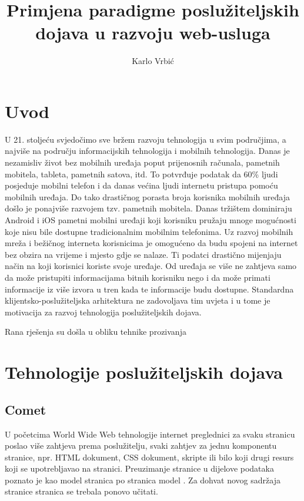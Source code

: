 \documentclass[times, utf8, zavrsni]{fer}
\begin{document}
\title{Primjena paradigme poslužiteljskih dojava u razvoju web-usluga}
\author{Karlo Vrbić}

\maketitle

\zahvala{}

\tableofcontents
\listoffigures

\chapter{Uvod}

U 21. stoljeću svjedočimo sve bržem razvoju tehnologija u svim područjima, a najviše na području informacijskih tehnologija i mobilnih tehnologija. Danas je nezamisliv život bez mobilnih uređaja poput prijenosnih računala, pametnih mobitela, tableta, pametnih satova, itd. To potvrđuje podatak da 60\% ljudi posjeduje mobilni telefon i da danas većina ljudi internetu pristupa pomoću mobilnih uređaja. Do tako drastičnog porasta broja korisnika mobilnih uređaja došlo je ponajviše razvojem tzv. pametnih mobitela. Danas tržištem dominiraju Android i iOS pametni mobilni uređaji koji korisniku pružaju mnoge mogućnosti koje nisu bile dostupne tradicionalnim mobilnim telefonima. Uz razvoj mobilnih mreža i bežičnog interneta korisnicima je omogućeno da budu spojeni na internet bez obzira na vrijeme i mjesto gdje se nalaze. Ti podatci drastično mijenjaju način na koji korisnici koriste svoje uređaje. Od uređaja se više ne zahtjeva samo da može pristupiti informacijama bitnih korisniku nego i da može primati informacije iz više izvora u tren kada te informacije budu dostupne. Standardna klijentsko-poslužiteljska arhitektura ne zadovoljava tim uvjeta i u tome je motivacija za razvoj tehnologija poslužiteljskih dojava.

Rana rješenja su došla u obliku tehnike prozivanja 

\chapter{Tehnologije poslužiteljskih dojava}

\section{Comet}
U početcima World Wide Web tehnologije internet preglednici za svaku stranicu poslao više zahtjeva prema poslužitelju, svaki zahtjev za jednu komponentu stranice, npr. HTML dokument, CSS dokument, skripte ili bilo koji drugi resurs koji se upotrebljavao na stranici. Preuzimanje stranice u dijelove podataka poznato je kao model stranica po stranica model . Za dohvat novog sadržaja stranice stranica se trebala ponovo učitati.
\end{document}
